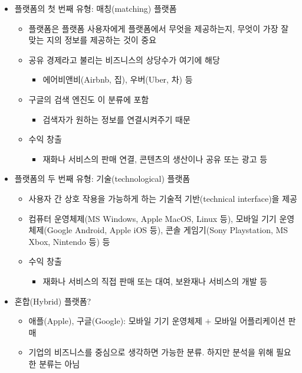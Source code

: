 \begin{itemize}
\begin{itemize}
\begin{itemize}
		\end{itemize}
	\end{itemize}
\item 플랫폼의 첫 번째 유형: 매칭(matching) 플랫폼 \cite[p. 19]{Cusumano:2019aa}
	\begin{itemize}
	\item 플랫폼은 플랫폼 사용자에게 플랫폼에서 무엇을 제공하는지, 무엇이 가장 잘 맞는 지의 정보를 제공하는 것이 중요
	\item 공유 경제라고 불리는 비즈니스의 상당수가 여기에 해당
		\begin{itemize}
		\item 에어비앤비(Airbnb, 집), 우버(Uber, 차) 등
		\end{itemize}	
	\item 구글의 검색 엔진도 이 분류에 포함 \citep{Varian:2016vt}
		\begin{itemize}
		\item 검색자가 원하는 정보를 연결시켜주기 때문
		\end{itemize}
	\item 수익 창출
		\begin{itemize}
		\item 재화나 서비스의 판매 연결, 콘텐츠의 생산이나 공유 또는 광고 등
		\end{itemize}
	\end{itemize}
\item 플랫폼의 두 번째 유형: 기술(technological) 플랫폼
	\begin{itemize}
	\item 사용자 간 상호 작용을 가능하게 하는 기술적 기반(technical interface)을 제공
	\item 컴퓨터 운영체제(MS Windows, Apple MacOS, Linux 등), 모바일 기기 운영체제(Google Android, Apple iOS 등), 콘솔 게임기(Sony Playstation, MS Xbox, Nintendo 등) 등
	\item 수익 창출
		\begin{itemize}
		\item 재화나 서비스의 직접 판매 또는 대여, 보완재나 서비스의 개발 등
		\end{itemize}
	\end{itemize}
\item 혼합(Hybrid) 플랫폼? 
	\begin{itemize}
	\item 애플(Apple), 구글(Google): 모바일 기기 운영체제 $+$ 모바일 어플리케이션 판매
	\item 기업의 비즈니스를 중심으로 생각하면 가능한 분류. 하지만 분석을 위해 필요한 분류는 아님
	\end{itemize}
\end{itemize}

